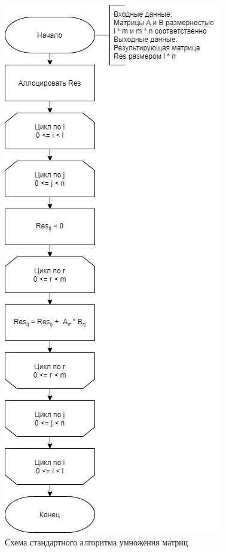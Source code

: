 \newpage
\begin{figure}[h!]
	\begin{center}
		\includegraphics[scale=0.6]{assets/multStand.png}
	\end{center}
	\caption{Схема стандартного алгоритма умножения матриц}
\end{figure}

